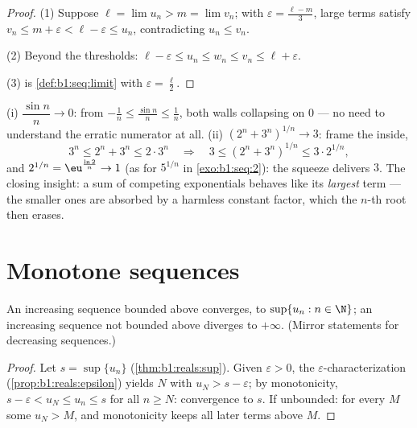 \begin{proof}
(1) Suppose $\ell = \lim u_n > m = \lim v_n$; with $\varepsilon =
\frac{\ell - m}{3}$, large terms satisfy $v_n \leq m + \varepsilon <
\ell - \varepsilon \leq u_n$, contradicting $u_n \leq v_n$.

(2) Beyond the thresholds: $\ell - \varepsilon \leq u_n \leq w_n \leq
v_n \leq \ell + \varepsilon$.

(3) is \cref{def:b1:seq:limit} with $\varepsilon = \frac\ell2$.
\end{proof}

\begin{example}\label{ex:b1:seq:squeezes}
(i) $\dfrac{\sin n}{n} \to 0$: from $-\frac1n \leq \frac{\sin
n}{n} \leq \frac1n$, both walls collapsing on $0$ --- no need to
understand the erratic numerator at all. (ii) $(2^n +
3^n)^{1/n} \to 3$: frame the inside,
\[
3^n \leq 2^n + 3^n \leq 2\cdot3^n
\quad\Longrightarrow\quad
3 \leq (2^n + 3^n)^{1/n} \leq 3\cdot 2^{1/n} ,
\]
and $2^{1/n} = \eu^{\frac{\ln 2}{n}} \to 1$ (as for $5^{1/n}$ in
\cref{exo:b1:seq:2}): the squeeze delivers $3$. The closing
insight: a sum of competing exponentials behaves like its
\emph{largest} term --- the smaller ones are absorbed by a
harmless constant factor, which the $n$-th root then erases.
\end{example}

\section{Monotone sequences}

\begin{theorem}\label{thm:b1:seq:monotone}
An increasing sequence bounded above converges, to $\sup\{u_n : n \in
\N\}$; an increasing sequence not bounded above diverges to
$+\infty$. (Mirror statements for decreasing
sequences.)
\end{theorem}

\begin{proof}
Let $s = \sup\{u_n\}$ (\cref{thm:b1:reals:sup}). Given $\varepsilon >
0$, the $\varepsilon$-characterization
(\cref{prop:b1:reals:epsilon}) yields $N$ with $u_N > s -
\varepsilon$; by monotonicity, $s - \varepsilon < u_N \leq u_n \leq
s$ for all $n \geq N$: convergence to $s$. If unbounded: for every
$M$ some $u_N > M$, and monotonicity keeps all later terms above $M$.
\end{proof}

